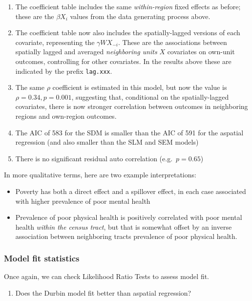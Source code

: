 \documentclass[
]{book}
\providecommand{\tightlist}{%
  \setlength{\itemsep}{0pt}\setlength{\parskip}{0pt}}
\begin{document}
\begin{enumerate}
\def\labelenumi{\arabic{enumi}.}
\tightlist
\item
  The coefficient table includes the same \emph{within-region} fixed effects as before; these are the \(\beta X_i\) values from the data generating process above.
\item
  The coefficient table now also includes the spatially-lagged versions of each covariate, representing the \(\gamma WX_{-i}\). These are the associations between spatially lagged and averaged \emph{neighboring units} \(X\) covariates on own-unit outcomes, controlling for other covariates. In the results above these are indicated by the prefix \texttt{lag.xxx}.
\item
  The same \(\rho\) coefficient is estimated in this model, but now the value is \(\rho = 0.34, p=0.001\), suggesting that, conditional on the spatially-lagged covariates, there is now stronger correlation between outcomes in neighboring regions and own-region outcomes.
\item
  The AIC of 583 for the SDM is smaller than the AIC of 591 for the aspatial regression (and also smaller than the SLM and SEM models)
\item
  There is no significant residual auto correlation (e.g.~\(p=0.65\))
\end{enumerate}

In more qualitative terms, here are two example interpretations:

\begin{itemize}
\tightlist
\item
  Poverty has both a direct effect and a spillover effect, in each case associated with higher prevalence of poor mental health
\item
  Prevalence of poor physical health is positively correlated with poor mental health \emph{within the census tract}, but that is somewhat offset by an inverse association between neighboring tracts prevalence of poor physical health.
\end{itemize}

\hypertarget{model-fit-statistics-1}{%
\subsubsection{Model fit statistics}\label{model-fit-statistics-1}}

Once again, we can check Likelihood Ratio Tests to assess model fit.

\begin{enumerate}
\def\labelenumi{\arabic{enumi}.}
\tightlist
\item
  Does the Durbin model fit better than aspatial regression?
\end{enumerate}
\end{document}
